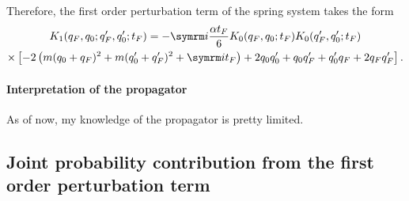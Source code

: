 Therefore, the first order perturbation term of the spring system takes the form
\begin{multline}
    K_1(q_F, q_0; q_F', q_0'; t_F) = -\im\frac{\alpha t_F}{6}K_0(q_F, q_0; t_F)K_0(q_F', q_0'; t_F) \\
    \times\left[-2\left(m(q_0 + q_F)^2 + m(q_0' + q_F')^2 + \im t_F\right) + 2q_0q_0' + q_0q_F' + q_0'q_F + 2q_Fq_F'\right]. \label{eq:spring_first_order_perturbation}
\end{multline}

\paragraph{Interpretation of the propagator} As of now, my knowledge of the propagator is pretty limited.

\subsection{Joint probability contribution from the first order perturbation term}

